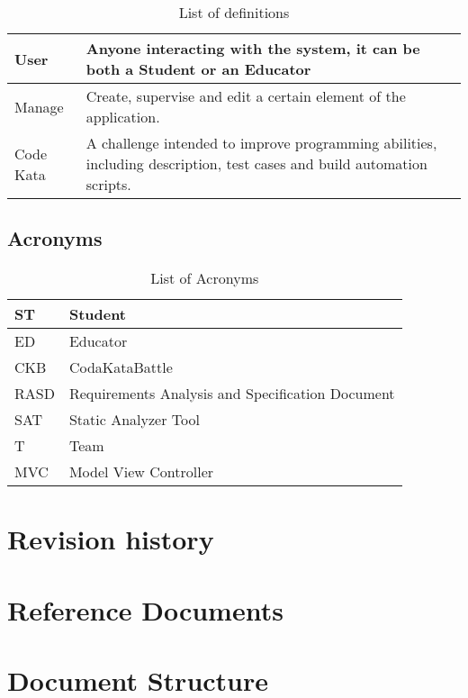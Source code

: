 \begin{table}[H]
  \begin{tabular}{|l|p{}|}

    \hline
    User & Anyone interacting with the system, it can be both a Student or an Educator    \\
    \hline
    Manage & Create, supervise and edit a certain element of the application. \\
    \hline
    Code Kata & A challenge intended to improve programming abilities, including description, test cases and build automation scripts. \\
    \hline
  \end{tabular}
  \caption{List of definitions}
  \label{tab:definitions}
\end{table}

\subsection{Acronyms}
\label{ss:Acronyms}

\begin{table}[H]
  \begin{tabular}{|l|l|}

    \hline
    ST & Student \\
    \hline
    ED & Educator \\
    \hline
    CKB & CodaKataBattle \\
    \hline
    RASD & Requirements Analysis and Specification Document     \\
    \hline
    SAT & Static Analyzer Tool    \\
    \hline
    T & Team    \\
    \hline
    MVC & Model View Controller    \\
    \hline
  \end{tabular}
  \caption{List of Acronyms}
  \label{tab:acronyms}
\end{table}


\section{Revision history}
\label{s:revision-history}%

\section{Reference Documents}
\label{s:reference-documents}%


\section{Document Structure}
\label{s:document-structure}%
